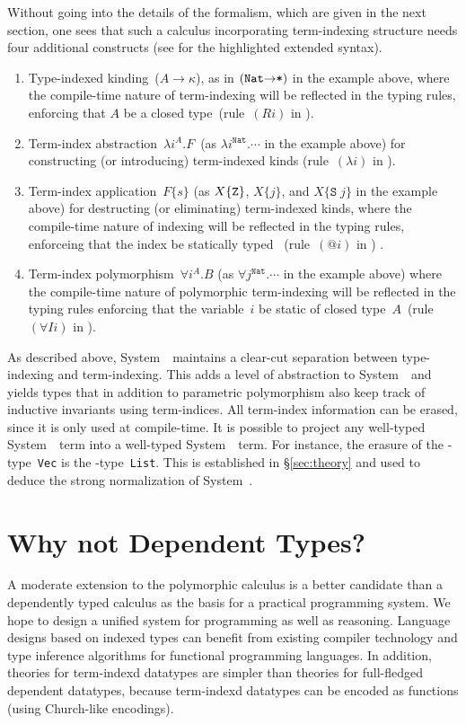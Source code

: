 Without going into the details of the formalism, which are given in the
next section, one sees that such a calculus incorporating term-indexing
structure needs four additional constructs (see  for the
highlighted extended syntax).
\begin{enumerate}
\item 
  Type-indexed kinding~($A\to\kappa$), as in $(\texttt{{Nat}\ensuremath{\to}*})$
  in the example above, where the compile-time nature of term-indexing
  will be reflected in the typing rules, enforcing that $A$ be a closed
  type~(rule~$(Ri)$ in ).

\item 
  Term-index abstraction~$\lambda i^A.F$~(as $\lambda
  i^{\texttt{{Nat}}}.\cdots$ in the example above) for constructing (or
  introducing) term-indexed kinds (rule~$(\lambda i)$ in
  ).  

\item 
  Term-index application~$F\{s\}$ (as $X\{{\tt Z}\}$, $X\{j\}$, and
  $X\{\texttt{S}\;j\}$ in the example above) for destructing (or
  eliminating) term-indexed kinds, where the compile-time nature of
  indexing will be reflected in the typing rules, enforceing that the index be
  statically typed%
~(rule~$(@i)$ in ) .

\item 
  Term-index polymorphism~$\forall i^A.B$ (as $\forall
  j^{\texttt{{Nat}}}.\cdots$ in the example above) where the compile-time
  nature of polymorphic term-indexing will be reflected in the typing rules enforcing
  that the variable~$i$ be static of closed type~$A$~(rule~$(\forall
  Ii)$ in ).
\end{enumerate}

As described above, System~\Fi\ maintains a clear-cut separation between
type-indexing and term-indexing.  This adds a level of abstraction
to System~\Fw\ and yields types that in addition to parametric polymorphism
also keep track of inductive invariants using term-indices. All term-index
information can be erased, since it is only used at compile-time.  
It is possible to project any well-typed System~\Fi\ term into a well-typed System~\Fw\ term.
For instance, the erasure of the \Fi-type~\texttt{Vec}
is the \Fw-type~\texttt{List}.  This is established in
\S\ref{sec:theory} and used to deduce the strong normalization of
System~\Fi.


\section{Why not Dependent Types?}
A moderate extension to the polymorphic calculus is a better candidate
than a dependently typed calculus as the basis for
a practical programming system. We hope to design
a unified system for programming as well as reasoning.
Language designs based on indexed types can benefit from
existing compiler technology and type inference algorithms for
functional programming languages. In addition, theories for
term-indexd datatypes are simpler than theories for full-fledged
dependent datatypes, because term-indexd datatypes can be encoded
as functions (using Church-like encodings).

